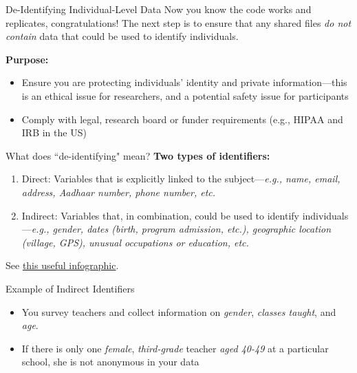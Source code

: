 \documentclass[12pt, compress]{beamer} %
\let\olditem\item %
\renewcommand{\item}{%
\olditem\vspace{\fill}}
\begin{document}
	\begin{frame}{De-Identifying Individual-Level Data}
		Now you know the code works and replicates, congratulations! The next step is to ensure that any shared files \textit{do not contain} data that could be used to identify individuals. 
		
		\bigskip
		
		\textbf{Purpose:} 
		\begin{itemize}
			\item Ensure you are \textcolor{burntorange}{protecting individuals' identity and private information}---this is an ethical issue for researchers, and a potential safety issue for participants
			\item Comply with legal, research board or funder requirements (e.g., HIPAA and IRB in the US) 
		\end{itemize}
		
	\end{frame}

	\begin{frame}{What does ``de-identifying" mean?}
		\textbf{Two types of identifiers:}
		
		\begin{enumerate}
			\item \textcolor{burntorange}{Direct:} Variables that is explicitly linked to the subject---\textit{e.g., name, email, address, Aadhaar number, phone number, etc.}
			\item \textcolor{burntorange}{Indirect:} Variables that, in combination, could be used to identify individuals---\textit{e.g., gender, dates (birth, program admission, etc.), geographic location (village, GPS), unusual occupations or education, etc.}
		\end{enumerate}
		
		\bigskip
		
		See \href{https://fpf.org/wp-content/uploads/2016/04/FPF_Visual-Guide-to-Practical-Data-DeID.pdf}{this useful infographic}.
	\end{frame}

	\begin{frame}{Example of Indirect Identifiers}	
		\begin{itemize}
			\item You survey teachers and collect information on \textit{gender}, \textit{classes taught}, and \textit{age}.
			\item If there is only one \textit{female}, \textit{third-grade} teacher \textit{aged 40-49} at a particular school, she is not anonymous in your data
		\end{itemize}
	\end{frame}		
\end{document}
